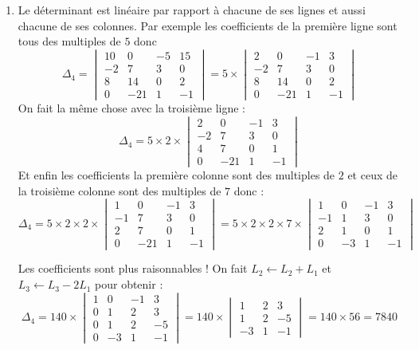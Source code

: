 {{\begin{enumerate}
  \item Le déterminant est linéaire par rapport à chacune de ses lignes
et aussi chacune de ses colonnes. 
Par exemple les coefficients de la première ligne sont tous des multiples
de $5$ donc 
$$\Delta_4 = 
\begin{vmatrix}
10 & 0 & -5 & 15 \\ -2 & 7 & 3 & 0 \\ 8 & 14 & 0 & 2 \\ 0 & -21 & 1 & -1
\end{vmatrix}
= 5 \times \begin{vmatrix}
2 & 0 & -1 & 3 \\ -2 & 7 & 3 & 0 \\ 8 & 14 & 0 & 2 \\ 0 & -21 & 1 & -1
\end{vmatrix}
$$
On fait la même chose avec la troisième ligne :
$$\Delta_4 = 5 \times 2 \times \begin{vmatrix}
2 & 0 & -1 & 3 \\ -2 & 7 & 3 & 0 \\ 4 & 7 & 0 & 1 \\ 0 & -21 & 1 & -1
\end{vmatrix}
$$
Et enfin les coefficients la première colonne sont des multiples de $2$ et 
ceux de la troisième colonne sont des multiples de $7$ donc :
$$\Delta_4 = 5 \times 2 \times 2 \times\begin{vmatrix}
1 & 0 & -1 & 3 \\ -1 & 7 & 3 & 0 \\ 2 & 7 & 0 & 1 \\ 0 & -21 & 1 & -1
\end{vmatrix}
= 5 \times 2 \times 2 \times 7  \times
\begin{vmatrix}
1 & 0 & -1 & 3 \\ -1 & 1 & 3 & 0 \\ 2 & 1 & 0 & 1 \\ 0 & -3 & 1 & -1
\end{vmatrix}
$$

Les coefficients sont plus raisonnables !
On fait $L_2\leftarrow L_2+L_1$ et $L_3\leftarrow L_3-2L_1$
pour obtenir :
$$\Delta_4 = 140 \times 
\begin{vmatrix}
1 & 0 & -1 & 3 \\ 0 & 1 & 2 & 3 \\ 0 & 1 & 2 & -5 \\ 0 & -3 & 1 & -1
\end{vmatrix}
=140 \times \begin{vmatrix}
 1 & 2 & 3 \\  1 & 2 & -5 \\ -3 & 1 & -1
\end{vmatrix}
= 140 \times 56 = 7840$$



\end{enumerate}}}
